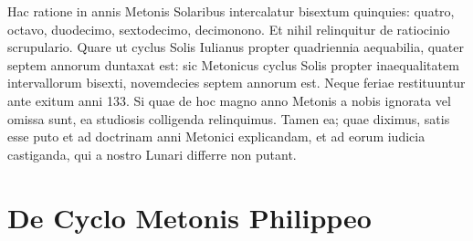 Hac ratione in annis  Metonis Solaribus intercalatur bisextum
quinquies: quatro, octavo, duodecimo, sextodecimo, decimonono.
Et nihil relinquitur de ratiocinio scrupulario.
Quare ut cyclus
Solis Iulianus propter quadriennia aequabilia, quater septem annorum
duntaxat est: sic Metonicus cyclus Solis propter inaequalitatem
intervallorum bisexti, novemdecies septem annorum est.
Neque feriae
restituuntur ante exitum anni 133.
Si quae de hoc magno anno Metonis
a nobis ignorata vel omissa sunt, ea studiosis colligenda relinquimus.
Tamen ea; quae diximus, satis esse puto et ad doctrinam anni
Metonici explicandam, et ad eorum iudicia castiganda, qui a nostro
Lunari differre non putant.

\section{De Cyclo Metonis Philippeo}

\begin{table}[htbp]
 
\end{table}

\begin{table}[htb]
 
\end{table}

